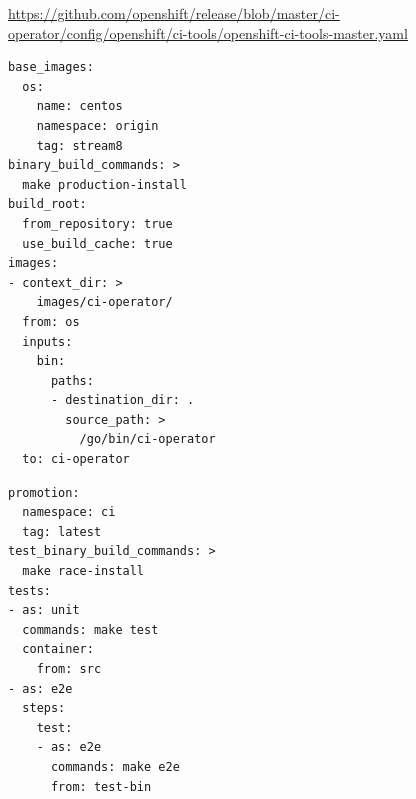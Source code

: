 \begin{frame}[fragile]
    \autotitle
    \footnotesize
    \url{https://github.com/openshift/release/blob/master/ci-operator/config/openshift/ci-tools/openshift-ci-tools-master.yaml}
    \scriptsize
    \begin{multicols}{2}
    \begin{verbatim}
base_images:
  os:
    name: centos
    namespace: origin
    tag: stream8
binary_build_commands: >
  make production-install
build_root:
  from_repository: true
  use_build_cache: true
images:
- context_dir: >
    images/ci-operator/
  from: os
  inputs:
    bin:
      paths:
      - destination_dir: .
        source_path: >
          /go/bin/ci-operator
  to: ci-operator
  \end{verbatim}
  \columnbreak
  \begin{verbatim}
promotion:
  namespace: ci
  tag: latest
test_binary_build_commands: >
  make race-install
tests:
- as: unit
  commands: make test
  container:
    from: src
- as: e2e
  steps:
    test:
    - as: e2e
      commands: make e2e
      from: test-bin
    \end{verbatim} %
    \end{multicols}
\end{frame}
